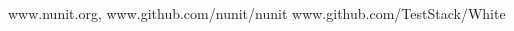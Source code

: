 \begin{thebibliography}{x}
 {\ttfamily www.nunit.org}, {\ttfamily www.github.com/nunit/nunit}
 {\ttfamily www.github.com/TestStack/White}
\end{thebibliography}